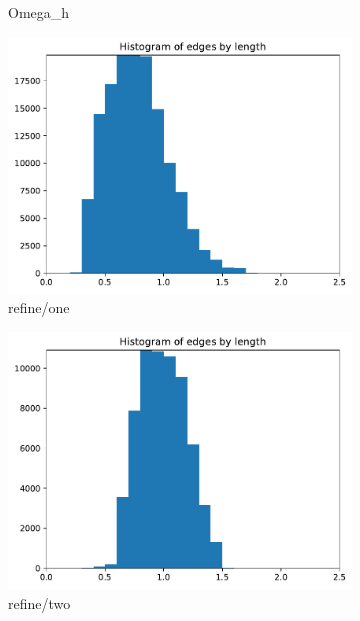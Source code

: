 \documentclass[3p,times,procedia,number]{elsarticle}
\begin{document}
\begin{figure}
\begin{subfigure}{.16\textwidth}
\caption{Omega\_h}
\end{subfigure}
\begin{subfigure}{.16\textwidth}
\centering
\includegraphics[width=\textwidth]{refine-one-cube-linear-length.pdf}
\caption{refine/one}
\label{fig:cube-linear-lengths-refine-one}
\end{subfigure}
\begin{subfigure}{.16\textwidth}
\centering
\includegraphics[width=\textwidth]{refine-two-cube-linear-length.pdf}
\caption{refine/two}
\end{subfigure}
\begin{subfigure}{.16\textwidth}
\centering

\end{subfigure}
\end{figure}
\end{document}
